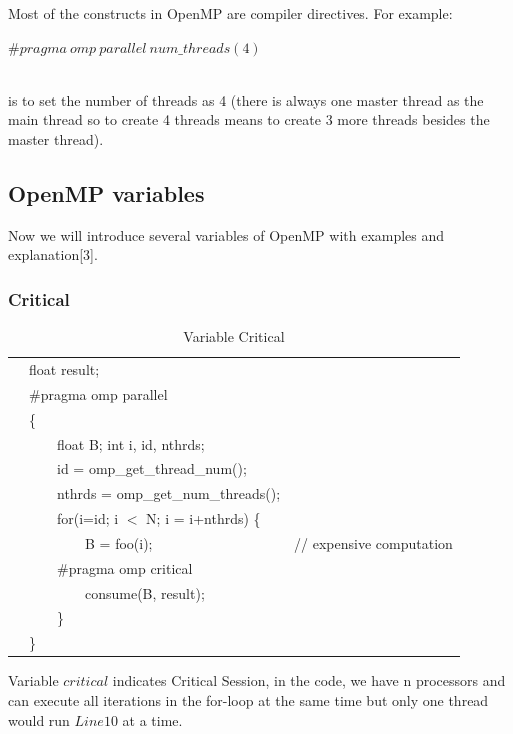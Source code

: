\documentclass[twoside]{article}
\newcounter{magicrownumbers}
\newcommand\rownumber{\stepcounter{magicrownumbers}\arabic{magicrownumbers}}
\renewcommand{\cite}[1]{[#1]}
\begin{document}
Most of the constructs in OpenMP are compiler directives. For example:\\
\centerline{$\# pragma\ omp\ parallel\ num\_threads(4)$}\\
is to set the number of threads as 4 (there is always one master thread as the main thread so to create 4 threads means to create 3 more threads besides the master thread).

\subsection{OpenMP variables}

Now we will introduce several variables of OpenMP with examples and explanation\cite{3}.

\subsubsection{Critical}
\begin{table}[!ht]
    \centering
    \begin{tabular}{l  l  l }
    \hline
        \rownumber & float result;  \\ 
        \rownumber & {\color{red}$\#$pragma omp parallel} \\ 
        \rownumber & \{ \\ 
        \rownumber & \ \ \ \ float B; int i, id, nthrds; \\ 
        \rownumber & \ \ \ \ id = omp\_get\_thread\_num();  \\ 
        \rownumber & \ \ \ \ nthrds = omp\_get\_num\_threads(); \\ 
        \rownumber & \ \ \ \ for(i=id; i $<$ N; i = i+nthrds) \{  \\ 
        \rownumber & \ \ \ \ \ \ \ \ B = foo(i); & // expensive computation \\ 
        \rownumber & \ \ \ \ {\color{red}$\#$pragma omp critical} \\ 
        \rownumber & \ \ \ \ \ \ \ \ consume(B, result); \\ 
        \rownumber & \ \ \ \ \} \\
        \rownumber & \} \\
        \hline
    \end{tabular}
    \caption*{Variable Critical}
\end{table}
\setcounter{magicrownumbers}{0}
Variable $critical$ indicates Critical Session, in the code, we have n processors and can execute all iterations in the for-loop at the same time but only one thread would run $Line 10$ at a time.
\end{document}
